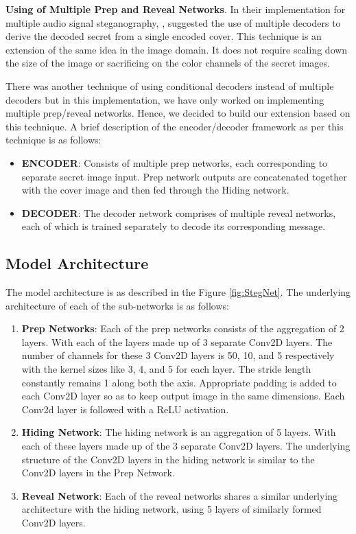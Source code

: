 \documentclass{article}
\begin{document}
\textbf{Using of Multiple Prep and Reveal Networks}. In their implementation for multiple audio signal steganography, \cite{kreuk2019hide}, suggested the use of multiple decoders to derive the decoded secret from a single encoded cover. This technique is an extension of the same idea in the image domain. It does not require scaling down the size of the image or sacrificing on the color channels of the secret images. 

There was another technique of using conditional decoders instead of multiple decoders but in this implementation, we have only worked on implementing multiple prep/reveal networks. Hence, we decided to build our extension based on this technique. A brief description of the encoder/decoder framework as per this technique is as follows:

\begin{itemize}
\item \textbf{ENCODER}: Consists of multiple prep networks, each corresponding to separate secret image input. Prep network outputs are concatenated together with the cover image and then fed through the Hiding network.
\item \textbf{DECODER}: The decoder network comprises of multiple reveal networks, each of which is trained separately to decode its corresponding message.
\end{itemize}

\subsection{Model Architecture}
The model architecture is as described in the Figure \ref{fig:StegNet}. The underlying architecture of each of the sub-networks is as follows:

\begin{enumerate}
    \item \textbf{Prep Networks}: Each of the prep networks consists of the aggregation of 2 layers. With each of the layers made up of 3 separate Conv2D layers. The number of channels for these 3 Conv2D layers is 50, 10, and 5 respectively with the kernel sizes like 3, 4, and 5 for each layer. The stride length constantly remains 1 along both the axis. Appropriate padding is added to each Conv2D layer so as to keep output image in the same dimensions. Each Conv2d layer is followed with a ReLU activation.
    
    \item \textbf{Hiding Network}: The hiding network is an aggregation of 5 layers. With each of these layers made up of the 3 separate Conv2D layers. The underlying structure of the Conv2D layers in the hiding network is similar to the Conv2D layers in the Prep Network.
    
    \item \textbf{Reveal Network}: Each of the reveal networks shares a similar underlying architecture with the hiding network, using 5 layers of similarly formed Conv2D layers.
\end{enumerate}
\end{document}
